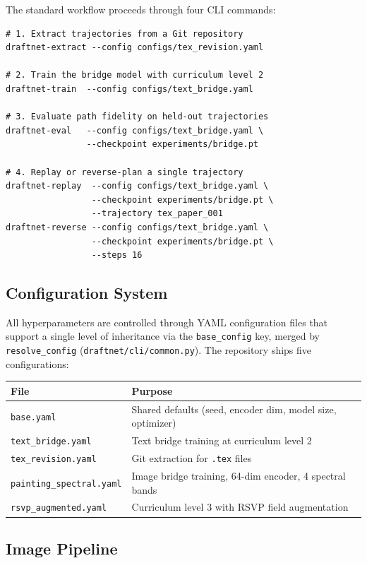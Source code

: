 \documentclass[12pt,a4paper]{article}
\theoremstyle{draftthm}
\newcommand{\code}[1]{\texttt{\small #1}}
\begin{document}
The standard workflow proceeds through four CLI commands:

\begin{lstlisting}
# 1. Extract trajectories from a Git repository
draftnet-extract --config configs/tex_revision.yaml

# 2. Train the bridge model with curriculum level 2
draftnet-train  --config configs/text_bridge.yaml

# 3. Evaluate path fidelity on held-out trajectories
draftnet-eval   --config configs/text_bridge.yaml \
                --checkpoint experiments/bridge.pt

# 4. Replay or reverse-plan a single trajectory
draftnet-replay  --config configs/text_bridge.yaml \
                 --checkpoint experiments/bridge.pt \
                 --trajectory tex_paper_001
draftnet-reverse --config configs/text_bridge.yaml \
                 --checkpoint experiments/bridge.pt \
                 --steps 16
\end{lstlisting}

\subsection{Configuration System}

All hyperparameters are controlled through YAML configuration files that support a single level of inheritance via the \code{base\_config} key, merged by \code{resolve\_config} (\code{draftnet/cli/common.py}). The repository ships five configurations:

\begin{center}
\begin{tabular}{ll}
\toprule
File & Purpose \\
\midrule
\code{base.yaml} & Shared defaults (seed, encoder dim, model size, optimizer) \\
\code{text\_bridge.yaml} & Text bridge training at curriculum level 2 \\
\code{tex\_revision.yaml} & Git extraction for \code{*.tex} files \\
\code{painting\_spectral.yaml} & Image bridge training, 64-dim encoder, 4 spectral bands \\
\code{rsvp\_augmented.yaml} & Curriculum level 3 with RSVP field augmentation \\
\bottomrule
\end{tabular}
\end{center}

\subsection{Image Pipeline}
\end{document}
